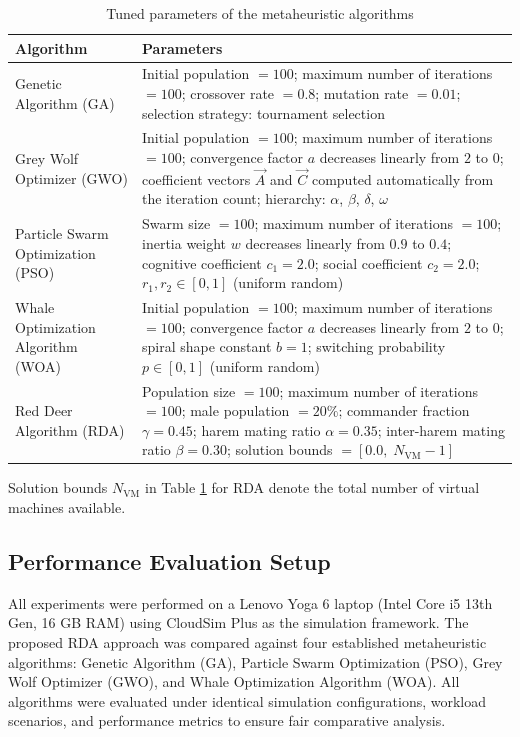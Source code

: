 \documentclass[pdflatex,sn-mathphys-num]{sn-jnl}%
\begin{document}
\begin{table}[htbp]
\centering
\caption{Tuned parameters of the metaheuristic algorithms}\label{tab:algo_params}
\begin{tabular}{@{}p{}p{}@{}}
\toprule
Algorithm & Parameters \\
\midrule
Genetic Algorithm (GA)
  & Initial population $= 100$; maximum number of iterations $= 100$;
    crossover rate $= 0.8$; mutation rate $= 0.01$;
    selection strategy: tournament selection \\[3pt]
Grey Wolf Optimizer (GWO)
  & Initial population $= 100$; maximum number of iterations $= 100$;
    convergence factor $a$ decreases linearly from $2$ to $0$;
    coefficient vectors $\vec{A}$ and $\vec{C}$ computed automatically
    from the iteration count; hierarchy: $\alpha$, $\beta$, $\delta$,
    $\omega$ \\[3pt]
Particle Swarm Optimization (PSO)
  & Swarm size $= 100$; maximum number of iterations $= 100$;
    inertia weight $w$ decreases linearly from $0.9$ to $0.4$; cognitive coefficient $c_1 = 2.0$;
    social coefficient $c_2 = 2.0$; $r_1, r_2 \in [0,1]$
    (uniform random) \\[3pt]
Whale Optimization Algorithm (WOA)
  & Initial population $= 100$; maximum number of iterations $= 100$;
    convergence factor $a$ decreases linearly from $2$ to $0$;
    spiral shape constant $b = 1$;
    switching probability $p \in [0,1]$ (uniform random)
    \\[3pt]
Red Deer Algorithm (RDA)
  & Population size $= 100$; maximum number of iterations $= 100$;
    male population $= 20\%$; commander fraction $\gamma = 0.45$;
    harem mating ratio $\alpha = 0.35$;
    inter-harem mating ratio $\beta = 0.30$;
    solution bounds $= [0.0,\; N_{\text{VM}} - 1]$ \\
\bottomrule
\end{tabular}
\end{table}
 
Solution bounds $N_{\text{VM}}$ in Table \ref{tab:algo_params} for RDA denote the total number of virtual machines available. 
 
\subsection{Performance Evaluation Setup}\label{subsec5.3}
 
All experiments were performed on a Lenovo Yoga 6 laptop (Intel Core i5 13th Gen, 16 GB RAM) using CloudSim Plus as the simulation framework. The proposed RDA approach was compared against four established metaheuristic algorithms: Genetic Algorithm (GA), Particle Swarm Optimization (PSO), Grey Wolf Optimizer (GWO), and Whale Optimization Algorithm (WOA). All algorithms were evaluated under identical simulation configurations, workload scenarios, and performance metrics to ensure fair comparative analysis. 
\end{document}
